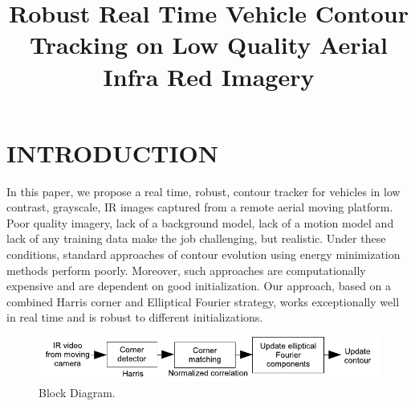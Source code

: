 \documentclass{article}
\title{Robust Real Time Vehicle Contour Tracking on Low Quality Aerial Infra Red Imagery}
\begin{document}
\onecolumn
%
\maketitle


\section{INTRODUCTION}
			
In this paper, we propose a real time, robust, contour tracker for vehicles in low contrast, grayscale, IR images captured from a remote aerial moving platform.  Poor quality imagery, lack of a background model, lack of a motion model and lack of any training data make the job challenging, but realistic.  Under these conditions, standard approaches of contour evolution using energy minimization methods perform poorly.  Moreover, such approaches are computationally expensive and are dependent on good initialization.  Our approach, based on a combined Harris corner and Elliptical Fourier strategy, works exceptionally well in real time and is robust to different initializations.

			\begin{figure}
						\centering
						\includegraphics[width=.50\textwidth]{figs/TRK_IGARSS2010_contour_ellipFourier_blockDiagram}
						\caption{Block Diagram.}
						\label{fig:BlockDiagram}
			\end{figure}
			
%			
			
\end{document}
